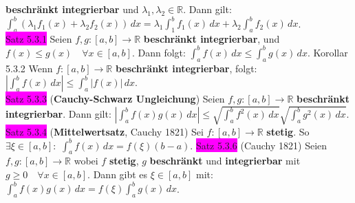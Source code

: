 \documentclass[landscape, 10pt]{article}
\newcommand{\R}{\mathbb{R}}
\begin{document}
\begin{multicols}{3}
                     \textbf{beschränkt 
                     integrierbar} und \textcolor{NavyBlue}{$\lambda_1,\lambda_2\in\R$}. 
                     Dann gilt: 
                     \textcolor{NavyBlue}{
                     $\int_a^b(\lambda_1f_1(x)+\lambda_2f_2(x))\,dx
                     =\lambda_1\int_1^bf_1(x)\,dx+\lambda_2\int_a^bf_2(x)\,dx$}.\\ 
              \colorbox{magenta}{Satz 5.3.1} 
                     Seien \textcolor{NavyBlue}{$f,g:[a,b]\longrightarrow\R$}
                     \textbf{beschränkt integrierbar}, und 
                     \textcolor{NavyBlue}{
                     $f(x)\leqslant g(x)\quad\forall x\in[a,b]$}.
                     Dann folgt: \textcolor{NavyBlue}{
                     $\int_a^bf(x)\,dx\leqslant\int_a^bg(x)\,dx$}. 
              \colorbox{BurntOrange}{Korollar 5.3.2} 
                     Wenn \textcolor{NavyBlue}{$f:[a,b]\longrightarrow\R$} 
                     \textbf{beschränkt integrierbar}, folgt: 
                     \textcolor{NavyBlue}{
                     $|\int_a^bf(x)\,dx|\leqslant\int_a^b|f(x)|\,dx$}.\\
              \colorbox{magenta}{Satz 5.3.3} 
              (\textbf{Cauchy-Schwarz Ungleichung}) 
                     Seien \textcolor{NavyBlue}{$f,g:[a,b]\longrightarrow\R$}
                     \textbf{beschränkt integrierbar}. Dann gilt: 
                     \textcolor{NavyBlue}{$|\int_a^bf(x)g(x)\,dx|
                     \leqslant\sqrt{\int_a^bf^2(x)\,dx}
                     \sqrt{\int_a^bg^2(x)\,dx}$}.\\
              \colorbox{magenta}{Satz 5.3.4} 
              (\textbf{Mittelwertsatz}, Cauchy 1821) 
                     Sei \textcolor{NavyBlue}{$f:[a,b]\longrightarrow\R$} 
                     \textbf{stetig}. So 
                     \textcolor{NavyBlue}{$\exists\xi\in[a,b]$}:\, 
                     \textcolor{NavyBlue}{$\int_a^bf(x)\,dx=f(\xi)(b-a)$}.
              \colorbox{magenta}{Satz 5.3.6} (Cauchy 1821) Seien 
                     \textcolor{NavyBlue}{$f,g:[a,b]\longrightarrow\R$} wobei 
                     \textcolor{NavyBlue}{$f$} \textbf{stetig}, 
                     \textcolor{NavyBlue}{$g$} \textbf{beschränkt} und 
                     \textbf{integrierbar} mit 
                     \textcolor{NavyBlue}{$g\geqslant0\quad\forall x\in[a,b]$}. 
                     Dann gibt es \textcolor{NavyBlue}{$\xi\in[a,b]$} mit: 
                     \textcolor{NavyBlue}{
                     $\int_a^bf(x)g(x)\,dx=f(\xi)\int_a^bg(x)\,dx$}. \\

\end{multicols}
\end{document}
